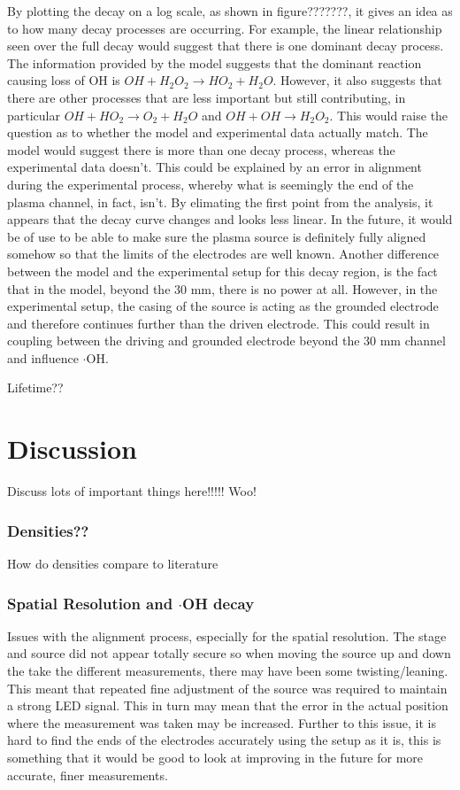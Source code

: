 \documentclass[11pt, oneside]{article}   	%
\begin{document}
By plotting the decay on a log scale, as shown in figure???????, it gives an idea as to how many decay processes are occurring. For example, the linear relationship seen over the full decay would suggest that there is one dominant decay process. 
The information provided by the model suggests that the dominant reaction causing loss of OH is $OH + H_2O_2 \rightarrow  HO_2 + H_2O$. However, it also suggests that there are other processes that are less important but still contributing, in particular $OH +HO_2 \rightarrow O_2 +H_2O$ and  $OH + OH \rightarrow H_2O_2$.
This would raise the question as to whether the model and experimental data actually match. The model would suggest there is more than one decay process, whereas the experimental data doesn't.
This could be explained by an error in alignment during the experimental process, whereby what is seemingly the end of the plasma channel, in fact, isn't. 
By elimating the first point from the analysis, it appears that the decay curve changes and looks less linear.
In the future, it would be of use to be able to make sure the plasma source is definitely fully aligned somehow so that the limits of the electrodes are well known.
Another difference between the model and the experimental setup for this decay region, is the fact that in the model, beyond the 30 mm, there is no power at all. However, in the experimental setup, the casing of the source is acting as the grounded electrode and therefore continues further than the driven electrode. This could result in coupling between the driving and grounded electrode beyond the 30 mm channel and influence $\cdot$OH.


Lifetime??





\section{Discussion}

Discuss lots of important things here!!!!! Woo!

\subsubsection{Densities??}
How do densities compare to literature

\subsubsection{Spatial Resolution and $\cdot$OH decay}
Issues with the alignment process, especially for the spatial resolution. The stage and source did not appear totally secure so when moving the source up and down the take the different measurements, there may have been some twisting/leaning. This meant that repeated fine adjustment of the source was required to maintain a strong LED signal. This in turn may mean that the error in the actual position where the measurement was taken may be increased. Further to this issue, it is hard to find the ends of the electrodes accurately using the setup as it is, this is something that it would be good to look at improving in the future for more accurate, finer measurements.
\end{document}
